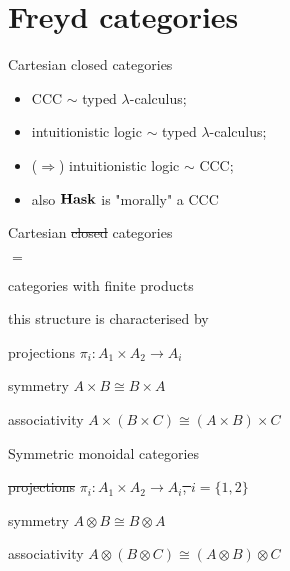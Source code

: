 \section{Freyd categories}

\frame{\tableofcontents[currentsection]}

\begin{frame}

    {\huge \center Cartesian closed categories}
    \begin{itemize}
        \item CCC $\sim$ typed $\lambda$-calculus;
        \item intuitionistic logic $\sim$ typed $\lambda$-calculus;
        \item ($\Rightarrow$) intuitionistic logic $\sim$ CCC;
        \item also $\mathbf{Hask}$ is "morally" a CCC
    \end{itemize}
\end{frame}

\begin{frame}
    \begin{center}
    \huge
    Cartesian \sout{closed} categories

    $=$

    categories with finite products
    \end{center}

    this structure is characterised by

    \begin{itemeyez}
        \item[projections] $\pi_i: A_1 \times A_2 \to A_i$
        \item[symmetry] $A \times B \cong B \times A$
        \item[associativity] $A \times (B \times C) \cong (A \times B) \times C$
    \end{itemeyez}
\end{frame}


\begin{frame}
    \begin{center}\huge Symmetric monoidal categories\end{center}
    \begin{itemeyez}
        \item[\sout{projections}] \sout{$\pi_i: A_1 \times A_2 \to A_i$, $i = \{1, 2\}$}
        \item[symmetry] $A \otimes B \cong B \otimes A$
        \item[associativity] $A \otimes (B \otimes C) \cong (A \otimes B) \otimes C$
    \end{itemeyez}

\end{frame}

